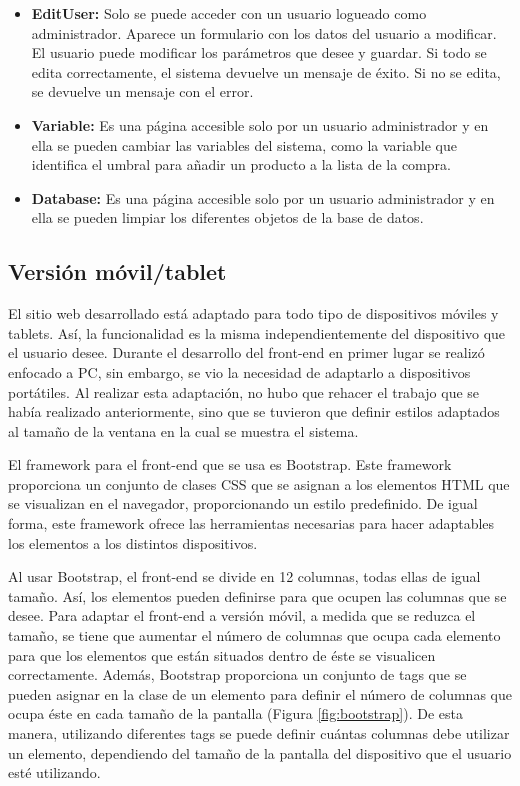 \begin{itemize}
    \item \textbf{EditUser:} Solo se puede acceder con un usuario logueado como administrador. Aparece un formulario con los datos del usuario a modificar. El usuario puede modificar los parámetros que desee y guardar. Si todo se edita correctamente, el sistema devuelve un mensaje de éxito. Si no se edita, se devuelve un mensaje con el error.
    
    \item \textbf{Variable:} Es una página accesible solo por un usuario administrador y en ella se pueden cambiar las variables del sistema, como la variable que identifica el umbral para añadir un producto a la lista de la compra.
    
    \item \textbf{Database:} Es una página accesible solo por un usuario administrador y en ella se pueden limpiar los diferentes objetos de la base de datos.
\end{itemize}

\subsection{Versión móvil/tablet}
El sitio web desarrollado está adaptado para todo tipo de dispositivos móviles y tablets. Así, la funcionalidad es la misma independientemente del dispositivo que el usuario desee. Durante el desarrollo del front-end en primer lugar se realizó enfocado a PC, sin embargo, se vio la necesidad de adaptarlo a dispositivos portátiles. Al realizar esta adaptación, no hubo que rehacer el trabajo que se había realizado anteriormente, sino que se tuvieron que definir estilos adaptados al tamaño de la ventana en la cual se muestra el sistema.

El framework para el front-end que se usa es Bootstrap. Este framework proporciona un conjunto de clases CSS que se asignan a los elementos HTML que se visualizan en el navegador, proporcionando un estilo predefinido. De igual forma, este framework ofrece las herramientas necesarias para hacer adaptables los elementos a los distintos dispositivos.

Al usar Bootstrap, el front-end se divide en 12 columnas, todas ellas de igual tamaño. Así, los elementos pueden definirse para que ocupen las columnas que se desee. Para adaptar el front-end a versión móvil, a medida que se reduzca el tamaño, se tiene que aumentar el número de columnas que ocupa cada elemento para que los elementos que están situados dentro de éste se visualicen correctamente. Además, Bootstrap proporciona un conjunto de tags que se pueden asignar en la clase de un elemento para definir el número de columnas que ocupa éste en cada tamaño de la pantalla (Figura \ref{fig:bootstrap}). De esta manera, utilizando diferentes tags se puede definir cuántas columnas debe utilizar un elemento, dependiendo del tamaño de la pantalla del dispositivo que el usuario esté utilizando.

